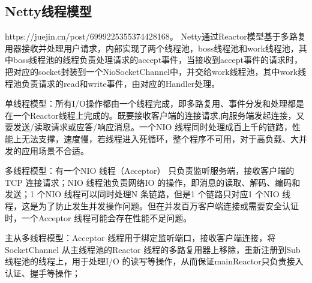 \documentclass[../../../interview-questions.tex]{subfiles}
\begin{document}
\subsection{Netty线程模型}

https://juejin.cn/post/6999225355374428168。
Netty通过Reactor模型基于多路复用器接收并处理用户请求，内部实现了两个线程池，boss线程池和work线程池，其中boss线程池的线程负责处理请求的accept事件，当接收到accept事件的请求时，把对应的socket封装到一个NioSocketChannel中，并交给work线程池，其中work线程池负责请求的read和write事件，由对应的Handler处理。

单线程模型：所有I/O操作都由一个线程完成，即多路复用、事件分发和处理都是在一个Reactor线程上完成的。既要接收客户端的连接请求,向服务端发起连接，又要发送/读取请求或应答/响应消息。一个NIO 线程同时处理成百上千的链路，性能上无法支撑，速度慢，若线程进入死循环，整个程序不可用，对于高负载、大并发的应用场景不合适。

多线程模型：有一个NIO 线程（Acceptor） 只负责监听服务端，接收客户端的TCP 连接请求；NIO 线程池负责网络IO 的操作，即消息的读取、解码、编码和发送；1 个NIO 线程可以同时处理N 条链路，但是1 个链路只对应1 个NIO 线程，这是为了防止发生并发操作问题。但在并发百万客户端连接或需要安全认证时，一个Acceptor 线程可能会存在性能不足问题。

主从多线程模型：Acceptor 线程用于绑定监听端口，接收客户端连接，将SocketChannel 从主线程池的Reactor 线程的多路复用器上移除，重新注册到Sub 线程池的线程上，用于处理I/O 的读写等操作，从而保证mainReactor只负责接入认证、握手等操作；
\end{document}
